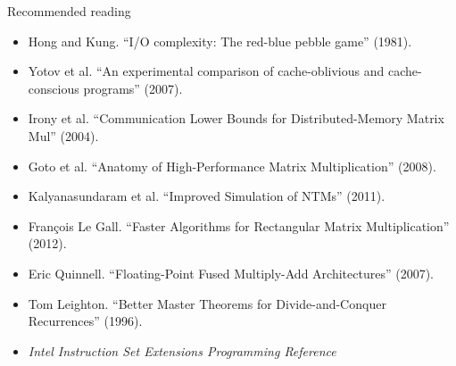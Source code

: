\documentclass[mathserif,xcolor={dvipsnames,table}]{beamer}
\begin{document}
%

\begin{frame}{Recommended reading}
\tiny{
\begin{itemize}
\item Hong and Kung. ``I/O complexity: The red-blue pebble game'' (1981).
\item Yotov et al. ``An experimental comparison of cache-oblivious and cache-conscious programs'' (2007).
\item Irony et al. ``Communication Lower Bounds for Distributed-Memory Matrix Mul'' (2004).
\item Goto et al. ``Anatomy of High-Performance Matrix Multiplication'' (2008).
\item Kalyanasundaram et al. ``Improved Simulation of NTMs'' (2011).
\item Fran\c{c}ois Le Gall. ``Faster Algorithms for Rectangular Matrix Multiplication'' (2012).
\item Eric Quinnell. ``Floating-Point Fused Multiply-Add Architectures'' (2007).
\item Tom Leighton. ``Better Master Theorems for Divide-and-Conquer Recurrences'' (1996).
\item \textit{Intel Instruction Set Extensions Programming Reference}
\end{itemize}
}
\end{frame}

\end{document}
